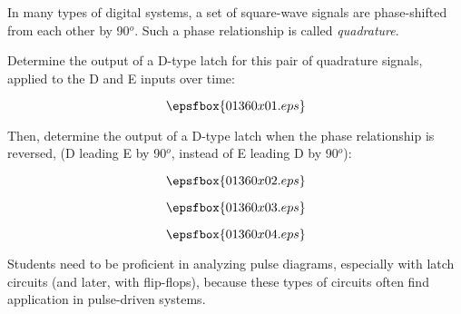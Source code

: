 

In many types of digital systems, a set of square-wave signals are phase-shifted from each other by 90$^{o}$.  Such a phase relationship is called {\it quadrature}.

Determine the output of a D-type latch for this pair of quadrature signals, applied to the D and E inputs over time:

$$\epsfbox{01360x01.eps}$$

\vskip 10pt

Then, determine the output of a D-type latch when the phase relationship is reversed, (D leading E by 90$^{o}$, instead of E leading D by 90$^{o}$):

$$\epsfbox{01360x02.eps}$$







$$\epsfbox{01360x03.eps}$$

\vskip 20pt

$$\epsfbox{01360x04.eps}$$







Students need to be proficient in analyzing pulse diagrams, especially with latch circuits (and later, with flip-flops), because these types of circuits often find application in pulse-driven systems.




